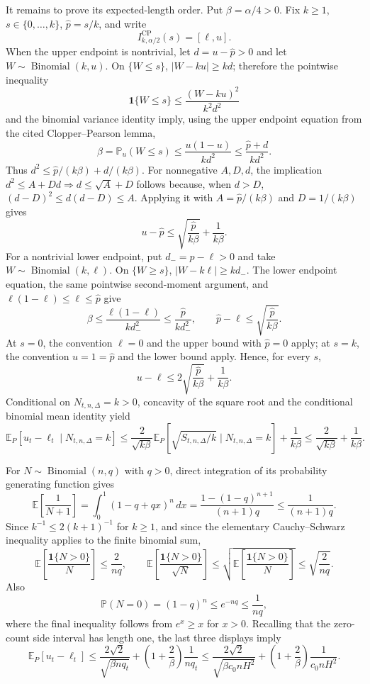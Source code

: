 It remains to prove its expected-length order.  Put \(\beta=\alpha/4>0\).  Fix \(k\geq1\), \(s\in\{0,\ldots,k\}\), \(\widehat p=s/k\), and write
\[
 I^{\mathrm{CP}}_{k,\alpha/2}(s)=[\ell,u].
\]
When the upper endpoint is nontrivial, let \(d=u-\widehat p>0\) and let \(W\sim\operatorname{Binomial}(k,u)\).  On \(\{W\leq s\}\), \(|W-ku|\geq kd\); therefore the pointwise inequality
\[
 \mathbf1\{W\leq s\}\leq\frac{(W-ku)^2}{k^2d^2}
\]
and the binomial variance identity imply, using the upper endpoint equation from the cited Clopper--Pearson lemma,
\[
 \beta=\mathbb P_u(W\leq s)
 \leq\frac{u(1-u)}{kd^2}
 \leq\frac{\widehat p+d}{kd^2}.
\]
Thus \(d^2\leq \widehat p/(k\beta)+d/(k\beta)\).  For nonnegative \(A,D,d\), the implication \(d^2\leq A+Dd\Rightarrow d\leq\sqrt A+D\) follows because, when \(d>D\), \((d-D)^2\leq d(d-D)\leq A\).  Applying it with \(A=\widehat p/(k\beta)\) and \(D=1/(k\beta)\) gives
\[
 u-\widehat p\leq\sqrt{\frac{\widehat p}{k\beta}}+\frac1{k\beta}.
\]
For a nontrivial lower endpoint, put \(d_-=\widehat p-\ell>0\) and take \(W\sim\operatorname{Binomial}(k,\ell)\).  On \(\{W\geq s\}\), \(|W-k\ell|\geq kd_-\).  The lower endpoint equation, the same pointwise second-moment argument, and \(\ell(1-\ell)\leq\ell\leq\widehat p\) give
\[
 \beta\leq\frac{\ell(1-\ell)}{kd_-^2}
 \leq\frac{\widehat p}{kd_-^2},
 \qquad
 \widehat p-\ell\leq\sqrt{\frac{\widehat p}{k\beta}}.
\]
At \(s=0\), the convention \(\ell=0\) and the upper bound with \(\widehat p=0\) apply; at \(s=k\), the convention \(u=1=\widehat p\) and the lower bound apply.  Hence, for every \(s\),
\[
 u-\ell\leq2\sqrt{\frac{\widehat p}{k\beta}}+\frac1{k\beta}.
\]
Conditional on \(N_{t,n,\Delta}=k>0\), concavity of the square root and the conditional binomial mean identity yield
\[
 \mathbb E_P[u_t-\ell_t\mid N_{t,n,\Delta}=k]
 \leq\frac{2}{\sqrt{k\beta}}
 \mathbb E_P\!\left[\sqrt{S_{t,n,\Delta}/k}\mid N_{t,n,\Delta}=k\right]
 +\frac1{k\beta}
 \leq\frac2{\sqrt{k\beta}}+\frac1{k\beta}.
\]

For \(N\sim\operatorname{Binomial}(n,q)\) with \(q>0\), direct integration of its probability generating function gives
\[
 \mathbb E\!\left[\frac1{N+1}\right]
 =\int_0^1(1-q+qx)^n\,dx
 =\frac{1-(1-q)^{n+1}}{(n+1)q}
 \leq\frac1{(n+1)q}.
\]
Since \(k^{-1}\leq2(k+1)^{-1}\) for \(k\geq1\), and since the elementary Cauchy--Schwarz inequality applies to the finite binomial sum,
\[
 \mathbb E\!\left[\frac{\mathbf1\{N>0\}}N\right]\leq\frac2{nq},
 \qquad
 \mathbb E\!\left[\frac{\mathbf1\{N>0\}}{\sqrt N}\right]
 \leq\sqrt{\mathbb E\!\left[\frac{\mathbf1\{N>0\}}N\right]}
 \leq\sqrt{\frac2{nq}}.
\]
Also
\[
 \mathbb P(N=0)=(1-q)^n\leq e^{-nq}\leq\frac1{nq},
\]
where the final inequality follows from \(e^x\geq x\) for \(x>0\).  Recalling that the zero-count side interval has length one, the last three displays imply
\[
 \mathbb E_P[u_t-\ell_t]
 \leq\frac{2\sqrt2}{\sqrt{\beta nq_t}}
 +\left(1+\frac2\beta\right)\frac1{nq_t}
 \leq\frac{2\sqrt2}{\sqrt{\beta c_0nH^2}}
 +\left(1+\frac2\beta\right)\frac1{c_0nH^2}.
\]

